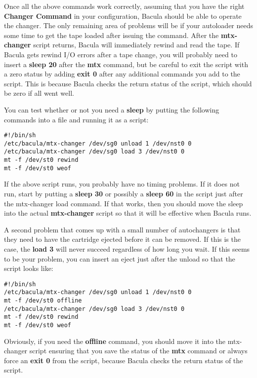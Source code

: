 Once all the above commands work correctly, assuming that you have the right
{\bf Changer Command} in your configuration, Bacula should be able to operate
the changer. The only remaining area of problems will be if your autoloader
needs some time to get the tape loaded after issuing the command. After the
{\bf mtx-changer} script returns, Bacula will immediately rewind and read the
tape. If Bacula gets rewind I/O errors after a tape change, you will probably
need to insert a {\bf sleep 20} after the {\bf mtx} command, but be careful to
exit the script with a zero status by adding {\bf exit 0} after any additional
commands you add to the script. This is because Bacula checks the return
status of the script, which should be zero if all went well. 

You can test whether or not you need a {\bf sleep} by putting the following
commands into a file and running it as a script: 

\footnotesize
\begin{verbatim}
#!/bin/sh
/etc/bacula/mtx-changer /dev/sg0 unload 1 /dev/nst0 0
/etc/bacula/mtx-changer /dev/sg0 load 3 /dev/nst0 0
mt -f /dev/st0 rewind
mt -f /dev/st0 weof
\end{verbatim}
\normalsize

If the above script runs, you probably have no timing problems. If it does not
run, start by putting a {\bf sleep 30} or possibly a {\bf sleep 60} in the 
script just after the mtx-changer load command. If that works, then you should
move the sleep into the actual {\bf mtx-changer} script so that it will be
effective when Bacula runs. 

A second problem that comes up with a small number of autochangers is that
they need to have the cartridge ejected before it can be removed. If this is
the case, the {\bf load 3} will never succeed regardless of how long you wait.
If this seems to be your problem, you can insert an eject just after the
unload so that the script looks like: 

\footnotesize
\begin{verbatim}
#!/bin/sh
/etc/bacula/mtx-changer /dev/sg0 unload 1 /dev/nst0 0
mt -f /dev/st0 offline
/etc/bacula/mtx-changer /dev/sg0 load 3 /dev/nst0 0
mt -f /dev/st0 rewind
mt -f /dev/st0 weof
\end{verbatim}
\normalsize

Obviously, if you need the {\bf offline} command, you should move it into the
mtx-changer script ensuring that you save the status of the {\bf mtx} command
or always force an {\bf exit 0} from the script, because Bacula checks the
return status of the script. 

